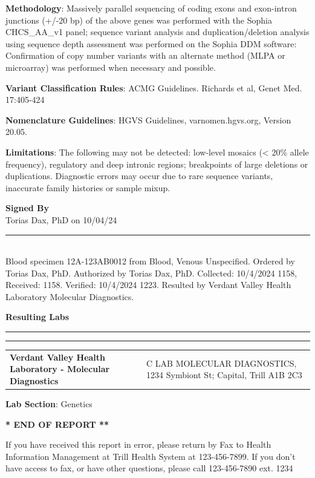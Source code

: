 \documentclass[10pt,letterpaper]{extarticle}
\newcommand{\doublerule}{\rule{\textwidth}{1pt}

\vspace{-2em}%
\rule{\textwidth}{1pt}}
\begin{document}
{\bf Methodology}: Massively parallel sequencing of coding exons and exon-intron junctions (+/-20 bp) of the above genes was performed with the Sophia CHCS\_AA\_v1 panel; sequence variant analysis and duplication/deletion analysis using sequence depth assessment was performed on the Sophia DDM software: Confirmation of copy number variants with an alternate method (MLPA or microarray) was performed when necessary and possible. 

{\bf Variant Classification Rules}: ACMG Guidelines. Richards et al, Genet Med. 17:405-424 

{\bf Nomenclature Guidelines}: HGVS Guidelines, varnomen.hgvs.org, Version 20.05. 

{\bf Limitations}: The following may not be detected: low-level mosaics (< 20\% allele frequency), regulatory and deep intronic regions; breakpoints of large deletions or duplications. Diagnostic errors may occur due to rare sequence variants, inaccurate family histories or sample mixup.

{\bf \large Signed By}\\
Torias Dax, PhD on 10/04/24

\vspace{2em}
\rule{\textwidth}{1pt}\\
{\small Blood specimen 12A-123AB0012 from Blood, Venous Unspecified. Ordered by Torias Dax, PhD. Authorized by Torias Dax, PhD. Collected: 10/4/2024 1158, Received: 1158. Verified: 10/4/2024 1223. Resulted by Verdant Valley Health Laboratory Molecular Diagnostics.}

\vspace{2em}
{\bf \large Resulting Labs}\\
\doublerule

\begin{tabular}{p{5cm} p{15cm}}
\bf \small Verdant Valley Health Laboratory - Molecular Diagnostics & \small C LAB MOLECULAR DIAGNOSTICS, 1234 Symbiont St; Capital, Trill A1B 2C3
\end{tabular}

{\bf Lab Section}: Genetics

\begin{center}
\bf ** END OF REPORT **
\end{center}

\begin{center}
\scriptsize
If you have received this report in error, please return by Fax to Health Information Management at Trill Health System at 123-456-7899. If you don't have access to fax, or have other questions, please call 123-456-7890 ext. 1234
\end{center}
\end{document}
